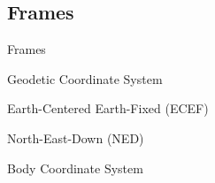 \subsection{Frames}

\begin{frame}{Frames}{}
  \begin{block}{Geodetic Coordinate System}

  \end{block}
  
  \begin{block}{Earth-Centered Earth-Fixed (ECEF)}

  \end{block}

  \begin{block}{North-East-Down (NED)}

  \end{block}

  \begin{block}{Body Coordinate System}

  \end{block}

\end{frame}

